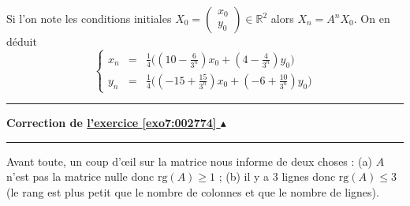 \documentclass[11pt,a4paper]{article}
\newcommand{\Rr}{\mathbb{R}} \newcommand{\R}{\mathbb{R}}
\renewcommand{\ge}{\geqslant} \renewcommand{\geq}{\geqslant}
\renewcommand{\le}{\leqslant} \renewcommand{\leq}{\leqslant}
\newcounter{exo}
\newcommand{\correction}[1]{\hypertarget{cor7:#1}{}\label{cor7:#1}{\bf Correction de \hyperlink{exo7:#1}{l'exercice \ref{exo7:#1} $\blacktriangle$}}\vspace{1mm}\hrule\vspace{1mm}}
\newcommand{\fincorrection}{\vspace{1mm}\hrule\vspace*{7mm}}
\begin{document}
\begin{enumerate}
Si l'on note les conditions initiales $X_0 = \begin{pmatrix}x_0 \\ y_0 \end{pmatrix} \in \Rr^2$ alors
$X_n = A^n X_0$.
On en déduit 
$$
\left\{\begin{array}{rcl}
x_n &=& \frac14 \Big(( 10- \frac{6} {3^n}) x_0 + (4- \frac{4} {3^n})  y_0 \Big)          \\
y_n &=& \frac14 \Big( (-15 + \frac{15} {3^n})x_0 + (-6 + \frac{10} {3^n}) y_0 \Big)   
\end{array}\right.
$$
\end{enumerate}


\fincorrection
\correction{002774}
Avant toute, un coup d'\oe il sur la matrice nous informe de deux choses :
(a) $A$  n'est pas la matrice nulle donc $\textrm{rg}(A)\ge 1$ ;
(b) il y a $3$ lignes donc $\textrm{rg}(A)\le 3$ (le rang est plus petit que le nombre 
de colonnes et que le nombre de lignes).
\end{document}
